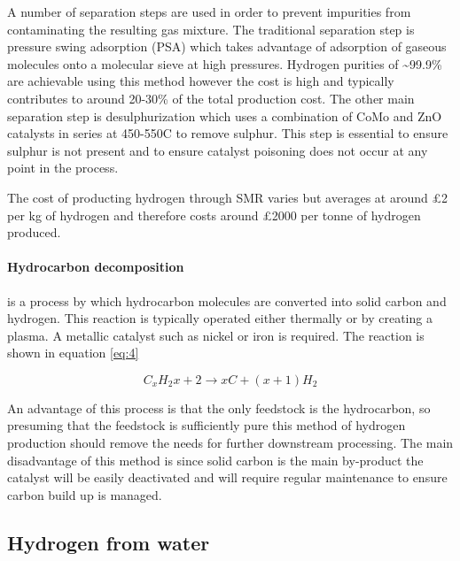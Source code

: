 A number of separation steps are used in order to prevent impurities from contaminating the 
resulting gas mixture. The traditional separation step is pressure swing adsorption (PSA) which takes 
advantage of adsorption of gaseous molecules onto a molecular sieve at high pressures. Hydrogen purities of \textasciitilde99.9\% are achievable using this method however the cost is high and typically contributes to around 
20-30\% of the total production cost. \cite{Muradov2015} The other main separation step is desulphurization which uses a 
combination of CoMo and ZnO catalysts in series at 450-550\textdegree C to remove sulphur. \cite{Muradov2015}
This step is essential to ensure sulphur is not present and to ensure catalyst 
poisoning does not occur at any point in the process. 

The cost of producting hydrogen through SMR varies but averages at around £2 per kg of hydrogen and therefore costs around £2000 per tonne of hydrogen produced. \cite{hydrogencouncil_2020}

\paragraph{Hydrocarbon decomposition} is a process by which hydrocarbon molecules are converted into solid carbon and hydrogen. \cite{Ahmed2009} This reaction is typically operated either thermally or by creating a plasma. A metallic catalyst such as nickel or iron is required. The reaction is shown in equation \ref{eq:4} \cite{Muradov2008} 

\begin{equation}\label{eq:4}
    C_x H_2x+2 \rightarrow xC + (x+1)H_2
\end{equation}

An advantage of this process is that the only feedstock is the hydrocarbon, so presuming that the feedstock is sufficiently pure this method of hydrogen production should remove the needs for further downstream processing. \cite{Ahmed2009} The main disadvantage of this method is since solid carbon is the main by-product the catalyst will be easily deactivated and will require regular maintenance to ensure carbon build up is managed. \cite{Ahmed2009}

\subsection{Hydrogen from water}

